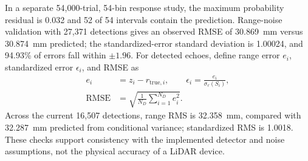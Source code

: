 \documentclass[11pt,letterpaper]{article}
\begin{document}
In a separate 54,000-trial, 54-bin response study, the maximum probability residual is 0.032 and 52 of 54 intervals contain the prediction. Range-noise validation with 27,371 detections gives an observed RMSE of 30.869~mm versus 30.874~mm predicted; the standardized-error standard deviation is 1.00024, and 94.93\% of errors fall within $\pm1.96$. For detected echoes, define range error $e_i$, standardized error $\epsilon_i$, and RMSE as
\begin{equation}\label{eq:range_metrics}
\begin{aligned}
e_i&=z_i-r_{\mathrm{true},i},\qquad \epsilon_i=\frac{e_i}{\sigma_r(S_i)},\\
\mathrm{RMSE}&=\sqrt{\frac{1}{N_D}\sum_{i=1}^{N_D}e_i^2}.
\end{aligned}
\end{equation}
Across the current 16,507 detections, range RMS is 32.358~mm, compared with 32.287~mm predicted from conditional variance; standardized RMS is 1.0018. These checks support consistency with the implemented detector and noise assumptions, not the physical accuracy of a LiDAR device.

\clearpage
\end{document}
